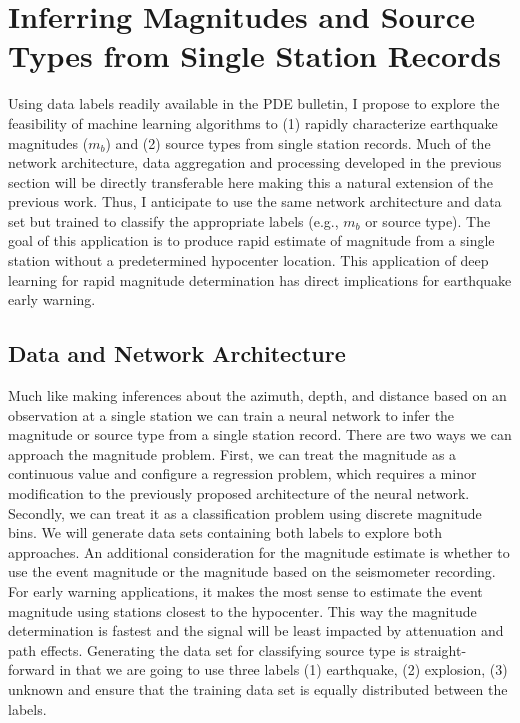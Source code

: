 \documentclass[12p]{article}
\begin{document}
\section{Inferring Magnitudes and Source Types from Single Station Records}

Using data labels readily available in the PDE bulletin, I propose to explore the feasibility of machine learning
algorithms to (1) rapidly characterize earthquake magnitudes ($m_b$) and (2) source types from single station records.
Much of the network architecture, data aggregation and processing developed in the previous section will be directly
transferable here making this a natural extension of the previous work. Thus, I anticipate to use the same network
architecture and data set but trained to classify the appropriate labels (e.g., $m_b$ or source type). The goal of this
application is to produce rapid estimate of magnitude from a single station without a predetermined hypocenter location.
This application of deep learning for rapid magnitude determination has direct implications for earthquake early warning.

\subsection{Data and Network Architecture}
Much like making inferences about the azimuth, depth, and distance based on an observation at a single station we can
train a neural network to infer the magnitude or source type from a single station record. There are two ways we can
approach the magnitude problem. First, we can treat the magnitude as a continuous value and configure a regression
problem, which requires a minor modification to the previously proposed architecture of the neural network. Secondly, we
can treat it as a classification problem using discrete magnitude bins. We will generate data sets containing both
labels to explore both approaches. An additional consideration for the magnitude estimate is whether to use the event
magnitude or the magnitude based on the seismometer recording. For early warning applications, it makes the most sense
to estimate the event magnitude using stations closest to the hypocenter. This way the magnitude determination is
fastest and the signal will be least impacted by attenuation and path effects. Generating the data set for classifying
source type is straight-forward in that we are going to use three labels (1) earthquake, (2) explosion, (3) unknown and
ensure that the training data set is equally distributed between the labels.
\end{document}
